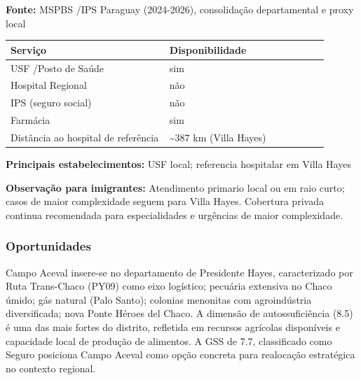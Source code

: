\textbf{Fonte:} MSPBS /\allowbreak  IPS Paraguay (2024-2026), consolidação
departamental e proxy local

{\def\LTcaptype{none} %
\begin{longtable}{@{}>{\raggedright\arraybackslash}p{0.45\linewidth} >{\raggedright\arraybackslash}p{0.45\linewidth}@{}}
\toprule\noalign{}
Serviço & Disponibilidade \\
\midrule\noalign{}
\endhead
\bottomrule\noalign{}
\endlastfoot
USF /\allowbreak  Posto de Saúde & sim \\
Hospital Regional & não \\
IPS (seguro social) & não \\
Farmácia & sim \\
Distância ao hospital de referência & \textasciitilde387 km (Villa
Hayes) \\
\end{longtable}
}

\textbf{Principais estabelecimentos:} USF local; referencia hospitalar
em Villa Hayes

\textbf{Observação para imigrantes:} Atendimento primario local ou em
raio curto; casos de maior complexidade seguem para Villa Hayes.
Cobertura privada continua recomendada para especialidades e urgências
de maior complexidade.
\newpage

\subsubsection*{Oportunidades}\label{oport-campo-aceval-1510}
Campo Aceval insere-se no departamento de Presidente Hayes, caracterizado por Ruta Trans-Chaco (PY09) como eixo logístico; pecuária extensiva no Chaco úmido; gás natural (Palo Santo); colonias menonitas com agroindústria diversificada; nova Ponte Héroes del Chaco. A dimensão de autossuficiência (8.5) é uma das mais fortes do distrito, refletida em recursos agrícolas disponíveis e capacidade local de produção de alimentos. A GSS de 7.7, classificado como Seguro posiciona Campo Aceval como opção concreta para realocação estratégica no contexto regional.

